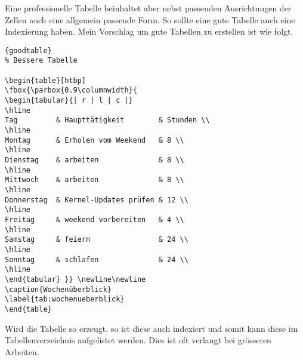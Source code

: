 \noindent
Eine professionelle Tabelle beinhaltet aber nebst passenden
Ausrichtungen der Zellen auch eine allgemein passende Form.
So sollte eine gute Tabelle auch eine Indexierung haben.
Mein Vorschlag um gute Tabellen zu erstellen ist wie folgt.

\begin{center}
\begin{lstlisting}[caption=Bessere Tabelle]{goodtable}
% Bessere Tabelle

\begin{table}[htbp]
\fbox{\parbox{0.9\columnwidth}{
\begin{tabular}{| r | l | c |}
\hline
Tag         & Haupttätigkeit        & Stunden \\
\hline
Montag      & Erholen vom Weekend   & 8 \\
\hline
Dienstag    & arbeiten              & 8 \\
\hline
Mittwoch    & arbeiten              & 8 \\
\hline
Donnerstag  & Kernel-Updates prüfen & 12 \\
\hline
Freitag     & weekend vorbereiten   & 4 \\
\hline
Samstag     & feiern                & 24 \\
\hline
Sonntag     & schlafen              & 24 \\
\hline
\end{tabular} }} \newline\newline
\caption{Wochenüberblick}
\label{tab:wochenueberblick}
\end{table}
\end{lstlisting}
\end{center}


\begin{table}[htbp]
\centering
{} \newline\newline
\caption{Wochenüberblick}
\label{tab:wochenueberblick}
\end{table}

\noindent
Wird die Tabelle so erzeugt. so ist diese auch indexiert
und somit kann diese im Tabellenverzeichnis aufgelistet
werden. Dies ist oft verlangt bei grösseren Arbeiten.
